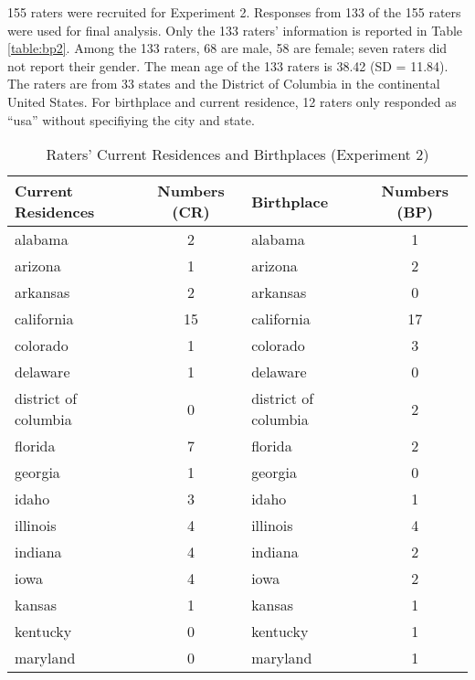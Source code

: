 155 raters were recruited for Experiment 2. Responses from 133 of the 155 raters were used for final analysis. Only the 133 raters’ information is reported in Table \ref{table:bp2}. Among the 133 raters, 68 are male, 58 are female; seven raters did not report their gender. The mean age of the 133 raters is 38.42 (SD = 11.84). The raters are from 33 states and the District of Columbia in the continental United States. For birthplace and current residence, 12 raters only responded as “usa” without specifiying the city and state.
\figSpace
\begin{longtable}{lclc}
  \caption{Raters' Current Residences and Birthplaces (Experiment 2)}\\
Current Residences   & Numbers (CR) & Birthplace           & Numbers (BP) \\
\hline
alabama              & 2            & alabama              & 1            \\
arizona              & 1            & arizona              & 2            \\
arkansas             & 2            & arkansas             & 0            \\
california           & 15           & california           & 17           \\
colorado             & 1            & colorado             & 3            \\
delaware             & 1            & delaware             & 0            \\
district of columbia & 0            & district of columbia & 2            \\
florida              & 7            & florida              & 2            \\
georgia              & 1            & georgia              & 0            \\
idaho                & 3            & idaho                & 1            \\
illinois             & 4            & illinois             & 4            \\
indiana              & 4            & indiana              & 2            \\
iowa                 & 4            & iowa                 & 2            \\
kansas               & 1            & kansas               & 1            \\
kentucky             & 0            & kentucky             & 1            \\
maryland             & 0            & maryland             & 1            \\

\end{longtable}
